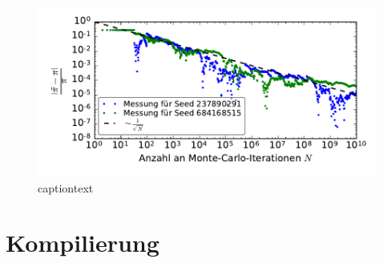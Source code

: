 \begin{figure}
	\centering
	\begin{minipage}{0.7\linewidth}
		\includegraphics[width=\linewidth]{monte-carlo-pi-error-scaling}
	\end{minipage}
	\caption{captiontext}
	\label{fig:monteerrorfloat}
\end{figure}


\section{Kompilierung}

